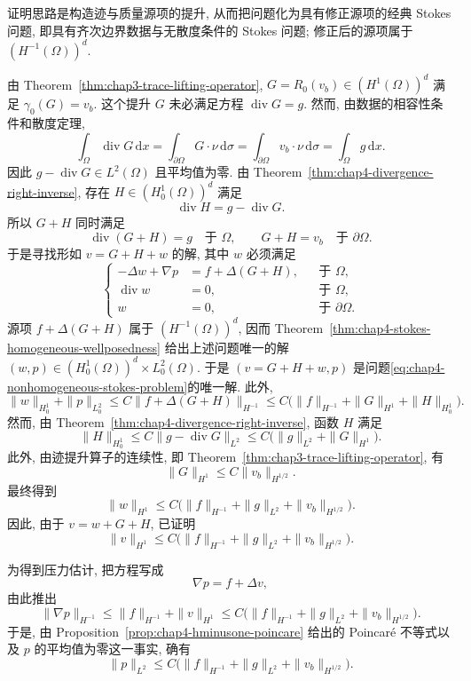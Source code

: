 \begin{Proof}
证明思路是构造迹与质量源项的提升, 从而把问题化为具有修正源项的经典 Stokes 问题, 即具有齐次边界数据与无散度条件的 Stokes 问题; 修正后的源项属于 $(H^{-1}(\Omega))^d$.

由 Theorem~\ref{thm:chap3-trace-lifting-operator}, $G=R_0(v_b)\in(H^1(\Omega))^d$ 满足 $\gamma_0(G)=v_b$. 这个提升 $G$ 未必满足方程 $\operatorname{div}G=g$. 然而, 由数据的相容性条件和散度定理,
\[
 \int_\Omega\operatorname{div}G\,\mathrm dx
 =\int_{\partial\Omega}G\cdot\nu\,\mathrm d\sigma
 =\int_{\partial\Omega}v_b\cdot\nu\,\mathrm d\sigma
 =\int_\Omega g\,\mathrm dx.
\]
因此 $g-\operatorname{div}G\in L^2(\Omega)$ 且平均值为零. 由 Theorem~\ref{thm:chap4-divergence-right-inverse}, 存在 $H\in(H_0^1(\Omega))^d$ 满足
\[
 \operatorname{div}H=g-\operatorname{div}G.
\]
所以 $G+H$ 同时满足
\[
 \operatorname{div}(G+H)=g\quad\text{于 }\Omega,
 \qquad G+H=v_b\quad\text{于 }\partial\Omega.
\]
于是寻找形如 $v=G+H+w$ 的解, 其中 $w$ 必须满足
\[
 \left\{
 \begin{aligned}
  -\Delta w+\nabla p&=f+\Delta(G+H),&&\text{于 }\Omega,\\
  \operatorname{div}w&=0,&&\text{于 }\Omega,\\
  w&=0,&&\text{于 }\partial\Omega.
 \end{aligned}
 \right.
\]
源项 $f+\Delta(G+H)$ 属于 $(H^{-1}(\Omega))^d$, 因而 Theorem~\ref{thm:chap4-stokes-homogeneous-wellposedness} 给出上述问题唯一的解 $(w,p)\in(H_0^1(\Omega))^d\times L_0^2(\Omega)$. 于是 $(v=G+H+w,p)$ 是问题\eqref{eq:chap4-nonhomogeneous-stokes-problem}的唯一解. 此外,
\[
 \|w\|_{H_0^1}+\|p\|_{L_0^2}
 \leq C\|f+\Delta(G+H)\|_{H^{-1}}
 \leq C\bigl(\|f\|_{H^{-1}}+\|G\|_{H^1}+\|H\|_{H_0^1}\bigr).
\]
然而, 由 Theorem~\ref{thm:chap4-divergence-right-inverse}, 函数 $H$ 满足
\[
 \|H\|_{H_0^1}\leq C\|g-\operatorname{div}G\|_{L^2}
 \leq C\bigl(\|g\|_{L^2}+\|G\|_{H^1}\bigr).
\]
此外, 由迹提升算子的连续性, 即 Theorem~\ref{thm:chap3-trace-lifting-operator}, 有
\[
 \|G\|_{H^1}\leq C\|v_b\|_{H^{1/2}}.
\]
最终得到
\[
 \|w\|_{H^1}\leq C\bigl(\|f\|_{H^{-1}}+\|g\|_{L^2}+\|v_b\|_{H^{1/2}}\bigr).
\]
因此, 由于 $v=w+G+H$, 已证明
\[
 \|v\|_{H^1}\leq C\bigl(\|f\|_{H^{-1}}+\|g\|_{L^2}+\|v_b\|_{H^{1/2}}\bigr).
\]

为得到压力估计, 把方程写成
\[
 \nabla p=f+\Delta v,
\]
由此推出
\[
 \|\nabla p\|_{H^{-1}}
 \leq\|f\|_{H^{-1}}+\|v\|_{H^1}
 \leq C\bigl(\|f\|_{H^{-1}}+\|g\|_{L^2}+\|v_b\|_{H^{1/2}}\bigr).
\]
于是, 由 Proposition~\ref{prop:chap4-hminusone-poincare} 给出的 Poincaré 不等式以及 $p$ 的平均值为零这一事实, 确有
\[
 \|p\|_{L^2}\leq C\bigl(\|f\|_{H^{-1}}+\|g\|_{L^2}+\|v_b\|_{H^{1/2}}\bigr).
\]
\end{Proof}

